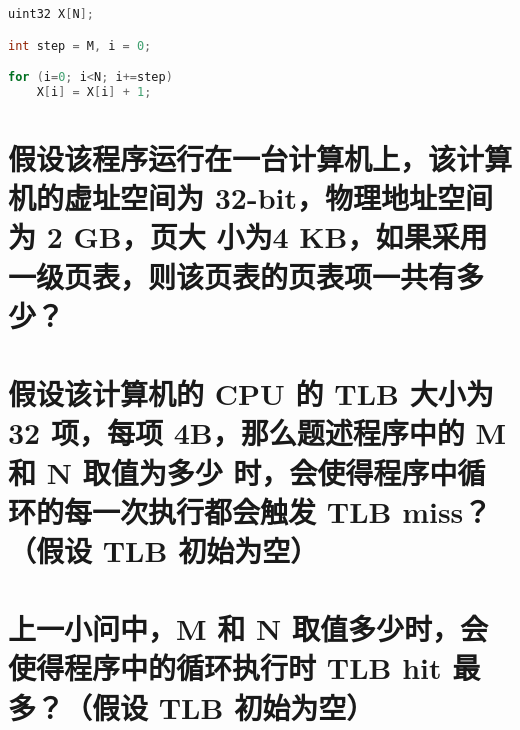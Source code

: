 
\begin{lstlisting}[language=C]
uint32 X[N];

int step = M, i = 0;

for (i=0; i<N; i+=step)
    X[i] = X[i] + 1;
\end{lstlisting}

\begin{parts}
    \part {
        假设该程序运行在一台计算机上，该计算机的虚址空间为 32-bit，物理地址空间为 2 GB，页大
        小为4 KB，如果采用一级页表，则该页表的页表项一共有多少？
    }

    \part {
        假设该计算机的 CPU 的 TLB 大小为 32 项，每项 4B，那么题述程序中的 M 和 N 取值为多少
        时，会使得程序中循环的每一次执行都会触发 TLB miss？（假设 TLB 初始为空）
    }

    \part {
        上一小问中，M 和 N 取值多少时，会使得程序中的循环执行时 TLB hit 最多？（假设 TLB
        初始为空）
    }
\end{parts}

\begin{solution}


\end{solution}
